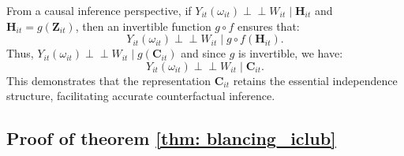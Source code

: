 \documentclass{article}
\newcommand{\indep}{\perp \!\!\! \perp}
\theoremstyle{plain}
\theoremstyle{definition}
\theoremstyle{remark}
\begin{document}
From a causal inference perspective, if $Y_{it}(\omega_{it}) \indep W_{it} \mid \mathbf{H}_{it}$ and $\mathbf{H}_{it} = g(\mathbf{Z}_{it})$, then an invertible function $g \circ f$ ensures that:
\[
Y_{it}(\omega_{it}) \indep W_{it} \mid g \circ f (\mathbf{H}_{it}).
\]
Thus, $Y_{it}(\omega_{it}) \indep W_{it} \mid g(\mathbf{C}_{it})$ and since $g$ is invertible, we have:
\[
Y_{it}(\omega_{it}) \indep W_{it} \mid \mathbf{C}_{it}.
\]
This demonstrates that the representation $\mathbf{C}_{it}$ retains the essential independence structure, facilitating accurate counterfactual inference.

\subsection{Proof of theorem \ref{thm: blancing_iclub}} 
\end{document}
